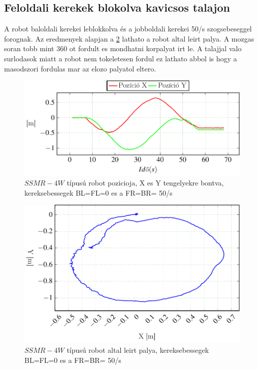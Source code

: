 \subsection{Feloldali kerekek blokolva kavicsos talajon}

A robot baloldali kerekei leblokkolva és a jobboldali kerekei 50\degree/s szogsebeseggel forognak. Az eredmenyek alapjan a \ref{fig:Left0Right50b} lathato a robot altal leirt palya. A mozgas soran tobb mint 360 \degree ot fordult es mondhatni korpalyat irt le. A talajjal valo surlodasok miatt a robot nem tokeletesen fordul ez lathato abbol is hogy a masodszori fordulas mar az elozo palyatol eltero. 

\renewcommand{\GlobalPath}{Meresek/Mozgasok/HibasMukodes/R_0_L_1/}
\renewcommand{\secondImage}{*}

%

%




\begin{figure}[H]
  \includegraphics{tikz/Left0Right50a.pdf}
  \caption{$SSMR-4W$ típusú robot pozicioja, X es Y tengelyekre bontva, kereksebessegek BL=FL=0 es a FR=BR= 50\degree/s}
    \label{fig:Left0Right50a}
\end{figure}


\begin{figure}[H]
  \includegraphics{tikz/Left0Right50b.pdf}
  \caption{$SSMR-4W$ típusú robot altal leirt palya, kereksebessegek BL=FL=0 es a FR=BR= 50\degree/s}
  \renewcommand{\figlabel}{Left0Right50b}
  \label{fig:Left0Right50b}
\end{figure}

